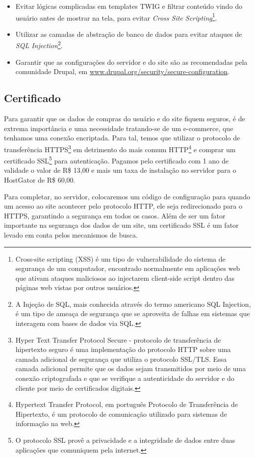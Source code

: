 \begin{itemize}
  \item Evitar lógicas complicadas em templates TWIG e filtrar conteúdo vindo do usuário antes de mostrar na tela, para evitar \textit{Cross Site Scripting}\footnote{Cross-site scripting (XSS) é um tipo de vulnerabilidade do sistema de segurança de um computador, encontrado normalmente em aplicações web que ativam ataques maliciosos ao injectarem client-side script dentro das páginas web vistas por outros usuários\cite{XSS}.}.
  \item Utilizar as camadas de abstração de banco de dados para evitar ataques de \textit{SQL Injection}\footnote{A Injeção de SQL, mais conhecida através do termo americano SQL Injection, é um tipo de ameaça de segurança que se aproveita de falhas em sistemas que interagem com bases de dados via SQL\cite{SQLInjection}.}.
  \item Garantir que as configurações do servidor e do site são as recomendadas pela comunidade Drupal, em \url{www.drupal.org/security/secure-configuration}.
\end{itemize}

\subsection{Certificado}
Para garantir que os dados de compras do usuário e do site fiquem seguros, é de extrema importância e uma necessidade tratando-se de um e-commerce, que tenhamos uma conexão encriptada. Para tal, temos que utilizar o protocolo de transferência HTTPS\footnote{Hyper Text Transfer Protocol Secure - protocolo de transferência de hipertexto seguro é uma implementação do protocolo HTTP sobre uma camada adicional de segurança que utiliza o protocolo SSL/TLS. Essa camada adicional permite que os dados sejam transmitidos por meio de uma conexão criptografada e que se verifique a autenticidade do servidor e do cliente por meio de certificados digitais.} em detrimento do mais comum HTTP\footnote{Hypertext Transfer Protocol, em português Protocolo de Transferência de Hipertexto, é um protocolo de comunicação utilizado para sistemas de informação na web\cite{HTTP}.} e comprar um certificado SSL\footnote{O protocolo SSL provê a privacidade e a integridade de dados entre duas aplicações que comuniquem pela internet\cite{SSL}.} para autenticação. Pagamos pelo certificado com 1 ano de validade o valor de R\$ 13,00 e mais um taxa de instalação no servidor para o HostGator de R\$ 60,00.

Para completar, no servidor, colocaremos um código de configuração para quando um acesso ao site acontecer pelo protocolo HTTP, ele seja redirecionado para o HTTPS, garantindo a segurança em todos os casos.
Além de ser um fator importante na segurança dos dados de um site, um certificado SSL é um fator levado em conta pelos mecanismos de busca.

